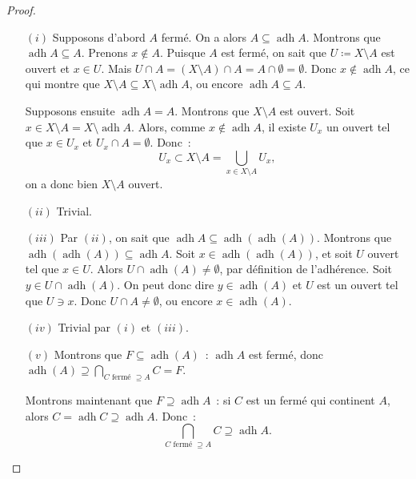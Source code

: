 \documentclass{report}
\theoremstyle{definition}
\theoremstyle{remark}
\DeclareMathOperator{\adh}{adh}
\begin{document}
		\begin{proof}~
		\begin{itemize}
			\item[$(i)$] Supposons d'abord $A$ fermé. On a alors $A \subseteq \adh A$. Montrons que $\adh A \subseteq A$. Prenons $x \not \in A$. Puisque $A$
			est fermé, on sait que $U \coloneqq X \setminus A$ est ouvert et $x \in U$. Mais $U \cap A = (X \setminus A) \cap A = A \cap \emptyset = \emptyset$.
			Donc $x \not \in \adh A$, ce qui montre que $X \setminus A \subseteq X \setminus \adh A$, ou encore $\adh A \subseteq A$.

			Supposons ensuite $\adh A = A$. Montrons que $X \setminus A$ est ouvert. Soit $x \in X \setminus A = X \setminus \adh A$. Alors, comme
			$x \not \in \adh A$, il existe $U_x$ un ouvert tel que $x \in U_x$ et $U_x \cap A = \emptyset$. Donc~:
			\[U_x \subset X \setminus A = \bigcup_{x \in X \setminus A}U_x,\]
			on a donc bien $X \setminus A$ ouvert.
			
			\item[$(ii)$] Trivial.
			\item[$(iii)$] Par $(ii)$, on sait que $\adh A \subseteq \adh(\adh(A))$. Montrons que $\adh(\adh(A)) \subseteq \adh A$. Soit $x \in \adh(\adh(A))$,
			et soit $U$ ouvert tel que $x \in U$. Alors $U \cap \adh(A) \neq \emptyset$, par définition de l'adhérence. Soit $y \in U \cap \adh(A)$. On peut
			donc dire $y \in \adh(A)$ et $U$ est un ouvert tel que $U \ni x$. Donc $U \cap A \neq \emptyset$, ou encore $x \in \adh(A)$.

			\item[$(iv)$] Trivial par $(i)$ et $(iii)$.
			\item[$(v)$] Montrons que $F \subseteq \adh(A)$~: $\adh A$ est fermé, donc $\adh(A) \supseteq \bigcap_{C \text{ fermé } \supseteq A}C = F$.

			Montrons maintenant que $F \supseteq \adh A$~: si $C$ est un fermé qui continent $A$, alors $C = \adh C \supseteq \adh A$. Donc~:
			\[\bigcap_{C \text{ fermé } \supseteq A}C \supseteq \adh A.\]
		\end{itemize}
		\end{proof}
\end{document}
